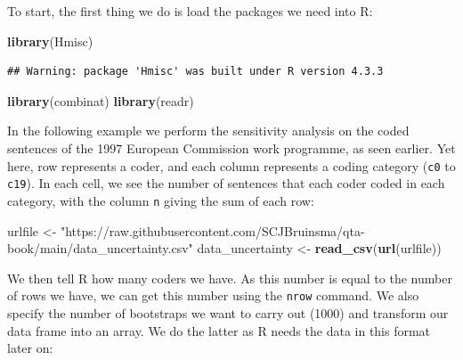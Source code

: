 \documentclass[
]{book}
\newenvironment{Shaded}{\begin{snugshade}}{\end{snugshade}}
\newcommand{\FunctionTok}[1]{\textcolor[rgb]{0.13,0.29,0.53}{\textbf{#1}}}
\newcommand{\NormalTok}[1]{#1}
\newcommand{\OtherTok}[1]{\textcolor[rgb]{0.56,0.35,0.01}{#1}}
\newcommand{\StringTok}[1]{\textcolor[rgb]{0.31,0.60,0.02}{#1}}
\begin{document}
To start, the first thing we do is load the packages we need into R:

\begin{Shaded}
\begin{Highlighting}[]
\FunctionTok{library}\NormalTok{(Hmisc)}
\end{Highlighting}
\end{Shaded}

\begin{verbatim}
## Warning: package 'Hmisc' was built under R version 4.3.3
\end{verbatim}

\begin{Shaded}
\begin{Highlighting}[]
\FunctionTok{library}\NormalTok{(combinat)}
\FunctionTok{library}\NormalTok{(readr)}
\end{Highlighting}
\end{Shaded}

In the following example we perform the sensitivity analysis on the coded sentences of the 1997 European Commission work programme, as seen earlier. Yet here, row represents a coder, and each column represents a coding category (\texttt{c0} to \texttt{c19}). In each cell, we see the number of sentences that each coder coded in each category, with the column \texttt{n} giving the sum of each row:

\begin{Shaded}
\begin{Highlighting}[]
\NormalTok{urlfile }\OtherTok{\textless{}{-}} \StringTok{"https://raw.githubusercontent.com/SCJBruinsma/qta{-}book/main/data\_uncertainty.csv"}
\NormalTok{data\_uncertainty }\OtherTok{\textless{}{-}} \FunctionTok{read\_csv}\NormalTok{(}\FunctionTok{url}\NormalTok{(urlfile))}
\end{Highlighting}
\end{Shaded}

We then tell R how many coders we have. As this number is equal to the number of rows we have, we can get this number using the \texttt{nrow} command. We also specify the number of bootstraps we want to carry out (1000) and transform our data frame into an array. We do the latter as R needs the data in this format later on:
\end{document}
